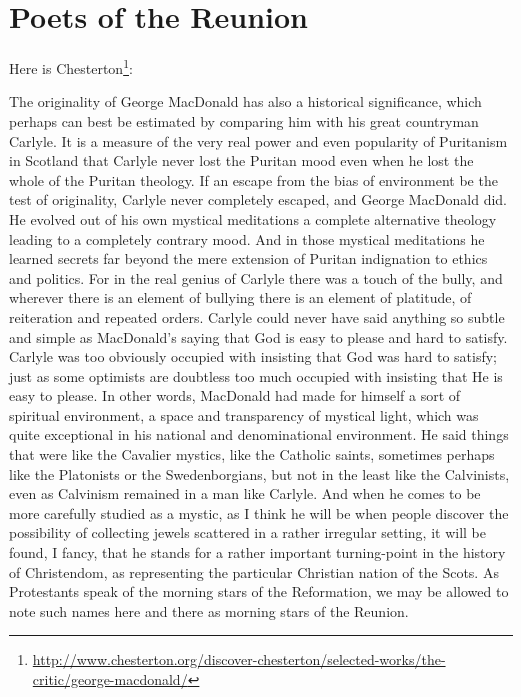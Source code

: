\section{Poets of the Reunion}

Here is Chesterton\footnote{\url{http://www.chesterton.org/discover-chesterton/selected-works/the-critic/george-macdonald/}}:

\begin{quotex}
The originality of George MacDonald has also a historical significance, which perhaps can best be estimated by comparing him with his great countryman Carlyle. It is a measure of the very real power and even popularity of Puritanism in Scotland that Carlyle never lost the Puritan mood even when he lost the whole of the Puritan theology. If an escape from the bias of environment be the test of originality, Carlyle never completely escaped, and George MacDonald did. He evolved out of his own mystical meditations a complete alternative theology leading to a completely contrary mood. And in those mystical meditations he learned secrets far beyond the mere extension of Puritan indignation to ethics and politics. For in the real genius of Carlyle there was a touch of the bully, and wherever there is an element of bullying there is an element of platitude, of reiteration and repeated orders. Carlyle could never have said anything so subtle and simple as MacDonald's saying that God is easy to please and hard to satisfy. Carlyle was too obviously occupied with insisting that God was hard to satisfy; just as some optimists are doubtless too much occupied with insisting that He is easy to please. In other words, MacDonald had made for himself a sort of spiritual environment, a space and transparency of mystical light, which was quite exceptional in his national and denominational environment. He said things that were like the Cavalier mystics, like the Catholic saints, sometimes perhaps like the Platonists or the Swedenborgians, but not in the least like the Calvinists, even as Calvinism remained in a man like Carlyle. And when he comes to be more carefully studied as a mystic, as I think he will be when people discover the possibility of collecting jewels scattered in a rather irregular setting, it will be found, I fancy, that he stands for a rather important turning-point in the history of Christendom, as representing the particular Christian nation of the Scots. As Protestants speak of the morning stars of the Reformation, we may be allowed to note such names here and there as morning stars of the Reunion.
\end{quotex}


